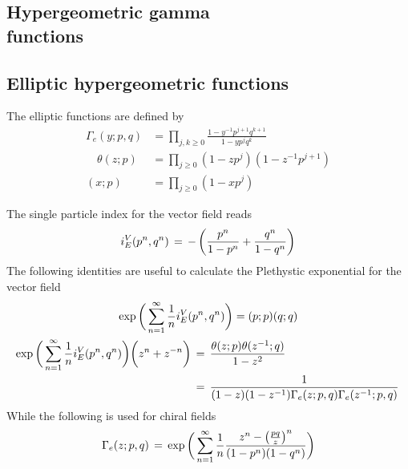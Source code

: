 \begin{appendices}
\chapter{Hypergeometric gamma \\ functions}
\label{appendix:gamma_functions}
\section{Elliptic hypergeometric functions}
The elliptic functions are defined by
\begin{equation} 
	\begin{aligned}
	   \Gamma_e (y;p,q) &= \prod_{j,k \geq 0} \frac{ 1 - y^{-1} p^{j+1} q^{k+1}}{ 1 - y p^j q^k}\\
	  \quad \theta(z;p) &= \prod_{j \geq 0 } (1- z p^j) ( 1- z^{-1}p^{j+1}) \\
	  (x;p) &= \prod_{j \geq 0} ( 1- xp^j)
  	\end{aligned}
\label{eqn:ellptic_hyper_definitions}
\end{equation}

The single particle index for the vector field reads
\begin{equation}
   i_E^V(p^n,q^n) \, = \, - \left( {p^n \over 1-p^n} + {q^n \over 1-q^n} \right)
\end{equation}
The following identities are useful to calculate the Plethystic exponential for the vector field
\begin{gather}
  \exp \bigg( \sum_{n=1}^{\infty} {1 \over n} i_E^{V} (p^n,q^n) \bigg)  = (p;p) (q;q) 
 \label{eqn:elliptic_index_vector_zero_modes_identity}
 \\
\begin{aligned}
\exp \bigg( \sum_{n=1}^{\infty} {1 \over n} i_E^{V} (p^n,q^n) \bigg) \bigg( z^n + z^{-n} \bigg) \,& =
\,  \frac{ \theta ( z;p) \theta (z^{-1};q) }{ 1-z^2 } \\
& =  \, \frac{1}{ ( 1 - z ) ( 1 - z^{-1}) \Gamma_e( z;p,q) \Gamma_e( z^{-1}; p,q)} \,
\label{eqn:elliptic_index_vector_adjoint}
\end{aligned}
\end{gather}
While the following is used for chiral fields
\begin{equation}
\Gamma_e(z;p,q) \, = \, \exp \bigg( \sum_{n=1}^{\infty} {1 \over n }
 \frac{ z^n - \big( {pq \over z} \big)^n }{(1-p^n) ( 1-q^n)} \bigg)
 \label{eqn:elliptic_gamma_chiral_identity}
\end{equation}



\end{appendices}
